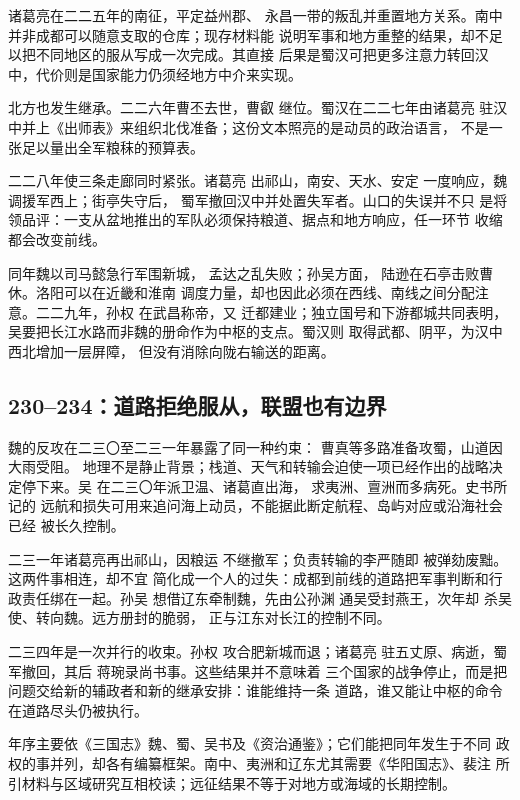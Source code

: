 诸葛亮在二二五年的南征，平定益州郡、
永昌一带的叛乱并重置地方关系。南中并非成都可以随意支取的仓库；现存材料能
说明军事和地方重整的结果，却不足以把不同地区的服从写成一次完成。其直接
后果是蜀汉可把更多注意力转回汉中，代价则是国家能力仍须经地方中介来实现。

北方也发生继承。二二六年曹丕去世，曹叡
继位。蜀汉在二二七年由诸葛亮
驻汉中并上《出师表》来组织北伐准备；这份文本照亮的是动员的政治语言，
不是一张足以量出全军粮秣的预算表。

二二八年使三条走廊同时紧张。诸葛亮
出祁山，南安、天水、安定
一度响应，魏调援军西上；街亭失守后，
蜀军撤回汉中并处置失军者。山口的失误并不只
是将领品评：一支从盆地推出的军队必须保持粮道、据点和地方响应，任一环节
收缩都会改变前线。

同年魏以司马懿急行军围新城，
孟达之乱失败；孙吴方面，
陆逊在石亭击败曹休。洛阳可以在近畿和淮南
调度力量，却也因此必须在西线、南线之间分配注意。二二九年，孙权
在武昌称帝，又
迁都建业；独立国号和下游都城共同表明，
吴要把长江水路而非魏的册命作为中枢的支点。蜀汉则
取得武都、阴平，为汉中西北增加一层屏障，
但没有消除向陇右输送的距离。

\subsection{230--234：道路拒绝服从，联盟也有边界}

魏的反攻在二三〇至二三一年暴露了同一种约束：
曹真等多路准备攻蜀，山道因大雨受阻。
地理不是静止背景；栈道、天气和转输会迫使一项已经作出的战略决定停下来。吴
在二三〇年派卫温、诸葛直出海，
求夷洲、亶洲而多病死。史书所记的
远航和损失可用来追问海上动员，不能据此断定航程、岛屿对应或沿海社会已经
被长久控制。

二三一年诸葛亮再出祁山，因粮运
不继撤军；负责转输的李严随即
被弹劾废黜。这两件事相连，却不宜
简化成一个人的过失：成都到前线的道路把军事判断和行政责任绑在一起。孙吴
想借辽东牵制魏，先由公孙渊
通吴受封燕王，次年却
杀吴使、转向魏。远方册封的脆弱，
正与江东对长江的控制不同。

二三四年是一次并行的收束。孙权
攻合肥新城而退；诸葛亮
驻五丈原、病逝，蜀军撤回，其后
蒋琬录尚书事。这些结果并不意味着
三个国家的战争停止，而是把问题交给新的辅政者和新的继承安排：谁能维持一条
道路，谁又能让中枢的命令在道路尽头仍被执行。

\begin{sourcenote}[这一段共同年代的材料边界]
年序主要依《三国志》魏、蜀、吴书及《资治通鉴》；它们能把同年发生于不同
政权的事并列，却各有编纂框架。南中、夷洲和辽东尤其需要《华阳国志》、裴注
所引材料与区域研究互相校读；远征结果不等于对地方或海域的长期控制。
\end{sourcenote}
